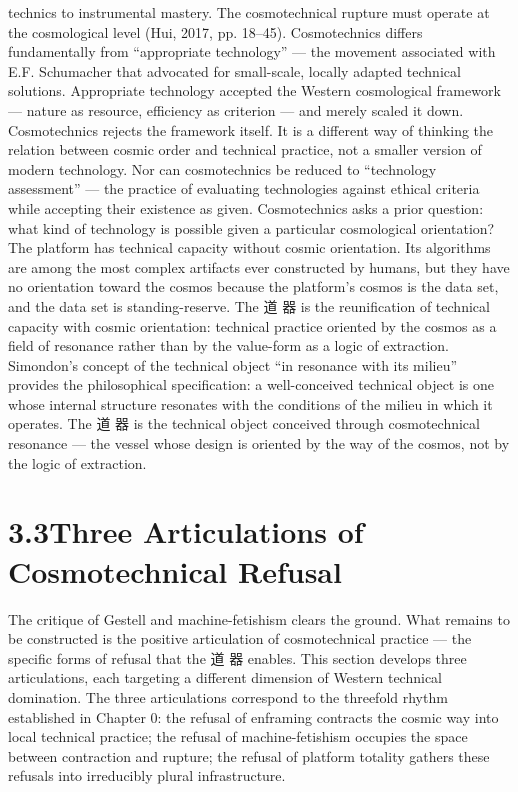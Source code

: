 technics to instrumental mastery. The cosmotechnical rupture must operate at the cosmological level (Hui, 2017, pp. 18–45). Cosmotechnics differs fundamentally from “appropriate technology” — the movement associated with E.F. Schumacher that advocated for small-scale, locally adapted technical solutions. Appropriate technology accepted the Western cosmological framework — nature as resource, efficiency as criterion — and merely scaled it down. Cosmotechnics rejects the framework itself. It is a different way of thinking the relation between cosmic order and technical practice, not a smaller version of modern technology. Nor can cosmotechnics be reduced to “technology assessment” — the practice of evaluating technologies against ethical criteria while accepting their existence as given. Cosmotechnics asks a prior question: what kind of technology is possible given a particular cosmological orientation? The platform has technical capacity without cosmic orientation. Its algorithms are among the most complex artifacts ever constructed by humans, but they have no orientation toward the cosmos because the platform’s cosmos is the data set, and the data set is standing-reserve. The 道 器 is the reunification of technical capacity with cosmic orientation: technical practice oriented by the cosmos as a field of resonance rather than by the value-form as a logic of extraction. Simondon’s concept of the technical object “in resonance with its milieu” provides the philosophical specification: a well-conceived technical object is one whose internal structure resonates with the conditions of the milieu in which it operates. The 道 器 is the technical object conceived through cosmotechnical resonance — the vessel whose design is oriented by the way of the cosmos, not by the logic of extraction.

\section{3.3\quad Three Articulations of Cosmotechnical Refusal}

The critique of Gestell and machine-fetishism clears the ground. What remains to be constructed is the positive articulation of cosmotechnical practice — the specific forms of refusal that the 道 器 enables. This section develops three articulations, each targeting a different dimension of Western technical domination. The three articulations correspond to the threefold rhythm established in Chapter 0: the refusal of enframing contracts the cosmic way into local technical practice; the refusal of machine-fetishism occupies the space between contraction and rupture; the refusal of platform totality gathers these refusals into irreducibly plural infrastructure.


